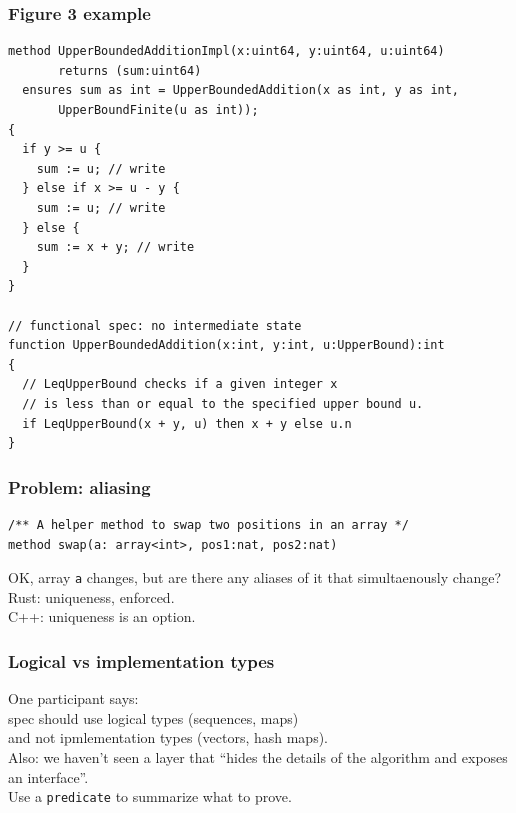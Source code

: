 \documentclass{beamer}
\newenvironment{changemargin}[1]{%
  \begin{list}{}{%
    \setlength{\topsep}{0pt}%
    \setlength{\leftmargin}{#1}%
    \setlength{\rightmargin}{1em}
    \setlength{\listparindent}{\parindent}%
    \setlength{\itemindent}{\parindent}%
    \setlength{\parsep}{\parskip}%
  }%
  \item[]}{\end{list}}
\begin{document}
\begin{frame}[fragile]
  \frametitle{Figure 3 example }

  \begin{lstlisting}[language=dafny]
method UpperBoundedAdditionImpl(x:uint64, y:uint64, u:uint64)
       returns (sum:uint64)
  ensures sum as int = UpperBoundedAddition(x as int, y as int, 
       UpperBoundFinite(u as int));
{
  if y >= u {
    sum := u; // write
  } else if x >= u - y {
    sum := u; // write 
  } else {
    sum := x + y; // write
  }
}

// functional spec: no intermediate state
function UpperBoundedAddition(x:int, y:int, u:UpperBound):int
{
  // LeqUpperBound checks if a given integer x
  // is less than or equal to the specified upper bound u.
  if LeqUpperBound(x + y, u) then x + y else u.n
}
\end{lstlisting}

\end{frame}

\begin{frame}[fragile]
  \frametitle{Problem: aliasing}
  \Large
\begin{lstlisting}[language=dafny]
/** A helper method to swap two positions in an array */
method swap(a: array<int>, pos1:nat, pos2:nat)
\end{lstlisting}

\begin{changemargin}{1cm}
  OK, array \texttt{a} changes, but are there any aliases of it that simultaenously change?\\[1em]
  Rust: uniqueness, enforced.\\
  C++: uniqueness is an option.
  \end{changemargin}
\end{frame}

\begin{frame}
  \frametitle{Logical vs implementation types}
  \large
\begin{changemargin}{1cm}
  One participant says:\\[1em]
  spec should use logical types (sequences, maps)\\
  and not ipmlementation types (vectors, hash maps).\\[1em]
  Also: we haven't seen a layer that ``hides the details of the algorithm and exposes an interface''.\\[1em]
  Use a \texttt{predicate} to summarize what to prove.
\end{changemargin}
\end{frame}
\end{document}
